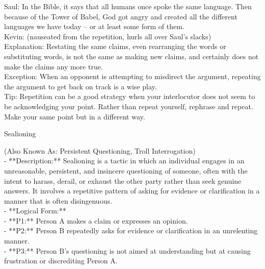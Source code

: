 \documentclass[a4paper,12pt,single,pdftex]{scrbook}
\begin{document}
{    
      Saul: In the Bible, it says that all humans once spoke the same language.  Then because of the Tower of Babel, God got angry and created all the different languages we have today -- or at least some form of them.
    \\

    
      Kevin: (nauseated from the repetition, hurls all over Saul’s slacks)
    \\

    
      Explanation: Restating the same claims, even rearranging the words or substituting words, is not the same as making new claims, and certainly does not make the claims any more true.
    \\

    
      Exception: When an opponent is attempting to misdirect the argument, repeating the argument to get back on track is a wise play.
    \\

    
      Tip: Repetition can be a good strategy when your interlocutor does not seem to be acknowledging your point. Rather than repeat yourself, rephrase and repeat. Make your same point but in a different way.
    \\

  }


Sealioning
    
      (Also Known As: Persistent Questioning, Troll Interrogation)
    \\

  
    
      - **Description:** Sealioning is a tactic in which an individual engages in an unreasonable, persistent, and insincere questioning of someone, often with the intent to harass, derail, or exhaust the other party rather than seek genuine answers. It involves a repetitive pattern of asking for evidence or clarification in a manner that is often disingenuous.
    \\

    
      - **Logical Form:**
    \\

    
        - **P1:** Person A makes a claim or expresses an opinion.
    \\

    
        - **P2:** Person B repeatedly asks for evidence or clarification in an unrelenting manner.
    \\

    
        - **P3:** Person B's questioning is not aimed at understanding but at causing frustration or discrediting Person A.
    \\
\end{document}
